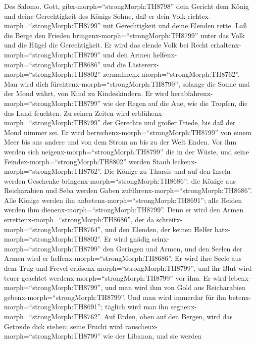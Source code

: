  Des Salomo. Gott, gibx-morph=``strongMorph:TH8798'' dein
Gericht dem König und deine Gerechtigkeit des Königs Sohne, 
daß er dein Volk richtex-morph=``strongMorph:TH8799'' mit Gerechtigkeit
und deine Elenden rette.  Laß die Berge den Frieden
bringenx-morph=``strongMorph:TH8799'' unter das Volk und die Hügel die
Gerechtigkeit.  Er wird das elende Volk bei Recht
erhaltenx-morph=``strongMorph:TH8799'' und den Armen
helfenx-morph=``strongMorph:TH8686'' und die
Lästererx-morph=``strongMorph:TH8802''
zermalmenx-morph=``strongMorph:TH8762''.  Man wird dich
fürchtenx-morph=``strongMorph:TH8799'', solange die Sonne und der Mond
währt, von Kind zu Kindeskindern.  Er wird
herabfahrenx-morph=``strongMorph:TH8799'' wie der Regen auf die Aue, wie
die Tropfen, die das Land feuchten.  Zu seinen Zeiten wird
erblühenx-morph=``strongMorph:TH8799'' der Gerechte und großer Friede,
bis daß der Mond nimmer sei.  Er wird
herrschenx-morph=``strongMorph:TH8799'' von einem Meer bis ans andere
und von dem Strom an bis zu der Welt Enden.  Vor ihm werden
sich neigenx-morph=``strongMorph:TH8799'' die in der Wüste, und seine
Feindex-morph=``strongMorph:TH8802'' werden Staub
leckenx-morph=``strongMorph:TH8762''.  Die Könige zu
Tharsis und auf den Inseln werden Geschenke
bringenx-morph=``strongMorph:TH8686''; die Könige aus Reicharabien und
Seba werden Gaben zuführenx-morph=``strongMorph:TH8686''. 
Alle Könige werden ihn anbetenx-morph=``strongMorph:TH8691''; alle
Heiden werden ihm dienenx-morph=``strongMorph:TH8799''. 
Denn er wird den Armen errettenx-morph=``strongMorph:TH8686'', der da
schreitx-morph=``strongMorph:TH8764'', und den Elenden, der keinen
Helfer hatx-morph=``strongMorph:TH8802''.  Er wird gnädig
seinx-morph=``strongMorph:TH8799'' den Geringen und Armen, und den
Seelen der Armen wird er helfenx-morph=``strongMorph:TH8686''.
 Er wird ihre Seele aus dem Trug und Frevel
erlösenx-morph=``strongMorph:TH8799'', und ihr Blut wird teuer geachtet
werdenx-morph=``strongMorph:TH8799'' vor ihm.  Er wird
lebenx-morph=``strongMorph:TH8799'', und man wird ihm von Gold aus
Reicharabien gebenx-morph=``strongMorph:TH8799''. Und man wird immerdar
für ihn betenx-morph=``strongMorph:TH8691''; täglich wird man ihn
segnenx-morph=``strongMorph:TH8762''.  Auf Erden, oben auf
den Bergen, wird das Getreide dick stehen; seine Frucht wird
rauschenx-morph=``strongMorph:TH8799'' wie der Libanon, und sie werden
